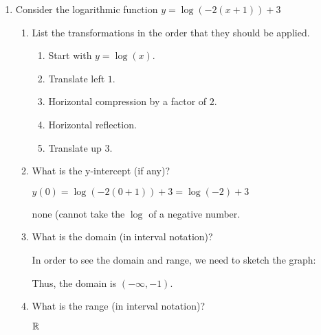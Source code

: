 \documentclass[letterpaper,12pt,fleqn]{article}
\begin{document}
\begin{enumerate}
\begin{enumerate}
  \end{enumerate}

\item Consider the logarithmic function $y=\log(-2(x+1))+3$
  \begin{enumerate}
  \item List the transformations in the order that they should be applied.

    \begin{enumerate}
    \item Start with $y=\log(x)$.
    \item Translate left $1$.
    \item Horizontal compression by a factor of $2$.
    \item Horizontal reflection.
    \item Translate up $3$.
    \end{enumerate}
    
  \item What is the y-intercept (if any)?

    $y(0)=\log(-2(0+1))+3=\log(-2)+3$

    none (cannot take the $\log$ of a negative number.
    
  \item What is the domain (in interval notation)?

    In order to see the domain and range, we need to sketch the graph:

    
    Thus, the domain is $(-\infty,-1)$.

  \item What is the range (in interval notation)?

    $\mathbb{R}$
  \end{enumerate}
\end{enumerate}
 
\end{document}
